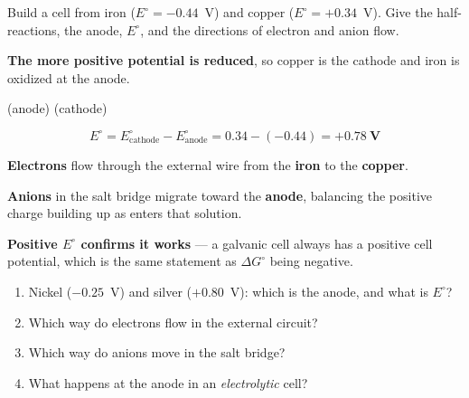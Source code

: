 \documentclass{apchem-worksheet}
\begin{document}
\begin{workedexample}
Build a cell from iron ($E^\circ = -0.44$~V) and copper
($E^\circ = +0.34$~V). Give the half-reactions, the anode, $E^\circ$, and
the directions of electron and anion flow.

\textbf{The more positive potential is reduced}, so copper is the
cathode and iron is oxidized at the anode.

 (anode) \quad
{} (cathode)

\[ E^\circ = E^\circ_{\text{cathode}} - E^\circ_{\text{anode}}
   = 0.34 - (-0.44) = \mathbf{+0.78~V} \]

\textbf{Electrons} flow through the external wire from the \textbf{iron}
to the \textbf{copper}.

\textbf{Anions} in the salt bridge migrate toward the \textbf{anode},
balancing the positive charge building up as  enters that
solution.

\textbf{Positive $E^\circ$ confirms it works} --- a galvanic cell always
has a positive cell potential, which is the same statement as
$\Delta G^\circ$ being negative.
\end{workedexample}

\begin{yourturn}
\begin{enumerate}[leftmargin=*,itemsep=0.5em]
  \item Nickel ($-0.25$~V) and silver ($+0.80$~V): which is the anode, and
        what is $E^\circ$? \workspace[1.8cm]
  \item Which way do electrons flow in the external circuit?
        \workspace[1.4cm]
  \item Which way do anions move in the salt bridge?
        \workspace[1.4cm]
  \item What happens at the anode in an \emph{electrolytic} cell?
        \workspace[1.6cm]
\end{enumerate}
\end{yourturn}
\end{document}
